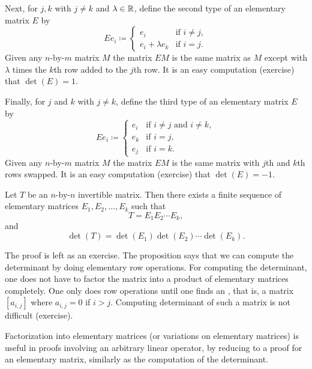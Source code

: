Next, for $j,k$ with $j\neq k$ and $\lambda \in {\mathbb{R}}$,
define the second type of an elementary matrix $E$ by
\begin{equation*}
Ee_i \coloneqq 
\begin{cases}
e_i               & \text{if } i \neq j , \\
e_i + \lambda e_k & \text{if } i = j .
\end{cases}
\end{equation*}
Given any $n$-by-$m$ matrix $M$ the matrix $EM$ is the same matrix as $M$
except with $\lambda$ times the $k$th row added to the $j$th row.
It is an easy computation (exercise) that $\det(E) = 1$.

Finally, for $j$ and $k$ with $j\neq k$, define
the third type of an elementary matrix $E$ by
\begin{equation*}
Ee_i \coloneqq 
\begin{cases}
e_i & \text{if } i \neq j \text{ and } i \neq k , \\
e_k & \text{if } i = j , \\
e_j & \text{if } i = k .
\end{cases}
\end{equation*}
Given any $n$-by-$m$ matrix $M$ the matrix $EM$ is the same matrix with
$j$th and $k$th rows swapped.
It is an easy computation (exercise) that $\det(E) = -1$.

\begin{prop} \label{prop:elemmatrixdecomp}
Let $T$ be an $n$-by-$n$ invertible matrix.  Then there exists a finite
sequence of elementary matrices $E_1, E_2, \ldots, E_k$ such that
\begin{equation*}
T = E_1 E_2 \cdots E_k ,
\end{equation*}
and
\begin{equation*}
\det(T) = \det(E_1)\det(E_2)\cdots \det(E_k) .
\end{equation*}
\end{prop}

The proof is left as an exercise.  The proposition says that we can compute
the determinant by doing elementary row operations.  For computing the
determinant, one does not have to factor the matrix into a product of
elementary matrices completely.  One only does row operations
until one finds an \emph{}, that is, a matrix
$[a_{i,j}]$ where $a_{i,j} = 0$ if $i > j$.  Computing determinant of such a
matrix is not difficult (exercise).

Factorization into elementary matrices (or variations on elementary
matrices) is useful in proofs involving an arbitrary linear operator, by
reducing to a proof for an elementary matrix, similarly as the computation
of the determinant.


